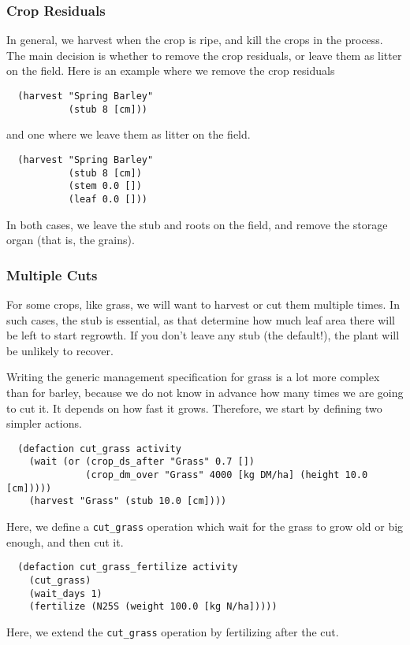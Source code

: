 \documentclass[a4paper,11pt]{article}
\begin{document}
\subsubsection{Crop Residuals}

In general, we harvest when the crop is ripe, and kill the crops in
the process. The main decision is whether to remove the crop
residuals, or leave them as litter on the field.  Here is an example
where we remove the crop residuals
\begin{verbatim}
  (harvest "Spring Barley"
           (stub 8 [cm]))
\end{verbatim}
and one where we leave them as litter on the field.
\begin{verbatim}
  (harvest "Spring Barley"
           (stub 8 [cm])
           (stem 0.0 [])
           (leaf 0.0 []))
\end{verbatim}
In both cases, we leave the stub and roots on the field, and remove
the storage organ (that is, the grains).

\subsubsection{Multiple Cuts}
\label{sec:cuts}

For some crops, like grass, we will want to harvest or cut them
multiple times.  In such cases, the stub is essential, as that
determine how much leaf area there will be left to start regrowth.  If
you don't leave any stub (the default!), the plant will be unlikely to
recover.

Writing the generic management specification for grass is a lot more
complex than for barley, because we do not know in advance how many
times we are going to cut it.  It depends on how fast it grows.
Therefore, we start by defining two simpler actions.
\begin{verbatim}
  (defaction cut_grass activity
    (wait (or (crop_ds_after "Grass" 0.7 [])
              (crop_dm_over "Grass" 4000 [kg DM/ha] (height 10.0 [cm]))))
    (harvest "Grass" (stub 10.0 [cm])))
\end{verbatim}
Here, we define a \texttt{cut\_grass} operation which wait for the
grass to grow old or big enough, and then cut it.

\begin{verbatim}
  (defaction cut_grass_fertilize activity
    (cut_grass)
    (wait_days 1)
    (fertilize (N25S (weight 100.0 [kg N/ha]))))
\end{verbatim}
Here, we extend the \texttt{cut\_grass} operation by fertilizing after
the cut.
\end{document}
